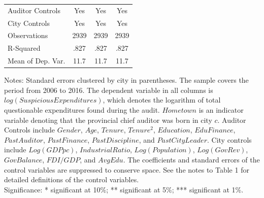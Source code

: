 \begin{table}[p]
\begin{threeparttable}
{\begin{tabular}{l*{3}{c}}
Auditor Controls & Yes & Yes & Yes \\
City Controls    & Yes & Yes & Yes \\
\hline
Observations        &        2939         &        2939         &        2939         \\
R-Squared           &        .827         &        .827         &        .827         \\
Mean of Dep. Var.   &        11.7         &        11.7         &        11.7         \\
\hline\hline
\end{tabular}}
\captionsetup{justification=justified,labelformat=empty}
\begin{tablenotes}
\item Notes: Standard errors clustered by city in parentheses. The sample covers the period from 2006 to 2016. The dependent variable in all columns is $ log(SuspiciousExpenditures) $, which denotes the logarithm of total questionable expenditures found during the audit. $ Hometown $ is an indicator variable denoting that the provincial chief auditor was born in city $ c $. Auditor Controls include $ Gender $, $ Age $, $ Tenure $, $ Tenure^2 $, $ Education $, $ EduFinance $, $ PastAuditor $, $ PastFinance $, $ PastDiscipline $, and $ PastCityLeader $. City controls include $ Log(GDP pc) $, $ IndustrialRatio $, $ Log(Population) $, $ Log(GovRev) $, $ GovBalance $, $ FDI/GDP $, and $ AvgEdu $. The coefficients and standard errors of the control variables are suppressed to conserve space. See the notes to Table 1 for detailed definitions of the control variables.   \\  Significance: * significant at 10\%; ** significant at 5\%; *** significant at 1\%.
\end{tablenotes}
\end{threeparttable}\end{table}
